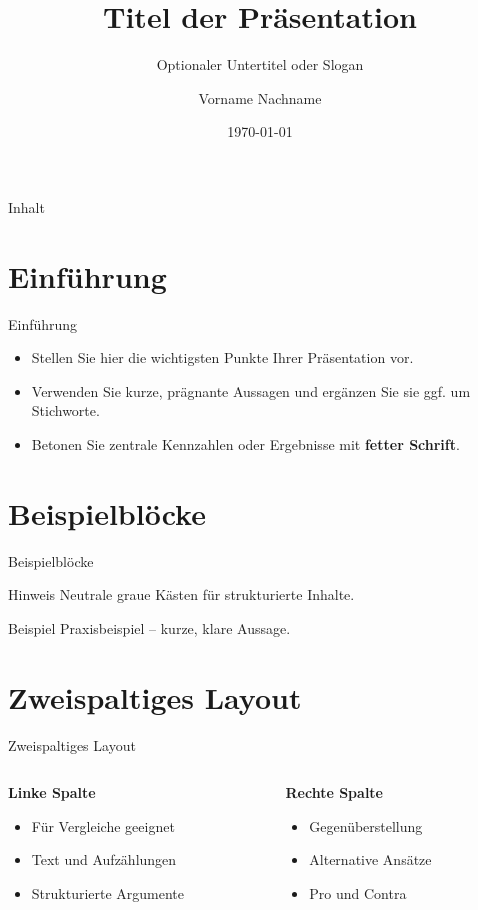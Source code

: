 \documentclass[aspectratio=169,10pt]{beamer}
\title{Titel der Präsentation}
\subtitle{Optionaler Untertitel oder Slogan}
\author{Vorname Nachname}
\institute{Organisation oder Unternehmen \\ Abteilung oder Fakultät}
\date{\today}
\begin{document}
\begin{frame}[plain]
  \titlepage
\end{frame}

\begin{frame}{Inhalt}
  \tableofcontents
\end{frame}

\section{Einführung}
\begin{frame}{Einführung}
\begin{itemize}
  \item Stellen Sie hier die wichtigsten Punkte Ihrer Präsentation vor.
  \item Verwenden Sie kurze, prägnante Aussagen und ergänzen Sie sie ggf. um Stichworte.
  \item Betonen Sie zentrale Kennzahlen oder Ergebnisse mit \textbf{fetter Schrift}.
\end{itemize}
\end{frame}

\section{Beispielblöcke}
\begin{frame}{Beispielblöcke}
\begin{block}{Hinweis}
  Neutrale graue Kästen für strukturierte Inhalte.
\end{block}
\begin{exampleblock}{Beispiel}
  Praxisbeispiel – kurze, klare Aussage.
\end{exampleblock}
\end{frame}

\section{Zweispaltiges Layout}
\begin{frame}{Zweispaltiges Layout}
\begin{columns}[T] %
  \begin{column}{0.48\textwidth}
    \textbf{Linke Spalte}
    \begin{itemize}
      \item Für Vergleiche geeignet
      \item Text und Aufzählungen
      \item Strukturierte Argumente
    \end{itemize}
  \end{column}
  \hfill
  \begin{column}{0.48\textwidth}
    \textbf{Rechte Spalte}
    \begin{itemize}
      \item Gegenüberstellung
      \item Alternative Ansätze
      \item Pro und Contra
    \end{itemize}
  \end{column}
\end{columns}
\end{frame}
\end{document}
